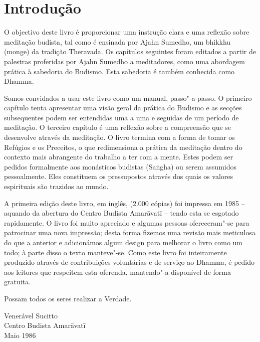 \chapter{Introdução}

O objectivo deste livro é proporcionar uma instrução clara e uma
reflexão sobre meditação budista, tal como é ensinada por Ajahn Sumedho,
um bhikkhu (monge) da tradição Theravada. Os capítulos seguintes foram
editados a partir de palestras proferidas por Ajahn Sumedho
a meditadores, como uma abordagem prática à sabedoria do Budismo. Esta
sabedoria é também conhecida como Dhamma.

Somos convidados a usar este livro como um manual, passo"-a-passo.
O primeiro capítulo tenta apresentar uma visão geral da
prática do Budismo e as secções subsequentes podem ser entendidas uma a
uma e seguidas de um período de meditação. O terceiro capítulo é uma
reflexão sobre a compreensão que se desenvolve através da meditação. O
livro termina com a forma de tomar os Refúgios e os Preceitos, o que
redimensiona a prática da meditação dentro do contexto mais abrangente
do trabalho a ter com a mente. Estes podem ser pedidos formalmente aos
monásticos budistas (Saṅgha) ou serem assumidos pessoalmente. Eles
constituem os pressupostos através dos quais os valores espirituais são
trazidos ao mundo.

A primeira edição deste livro, em inglês, (2.000 cópias) foi impressa em
1985 -- aquando da abertura do Centro Budista Amarāvatī -- tendo esta se
esgotado rapidamente. O livro foi muito apreciado e algumas pessoas
ofereceram"-se para patrocinar uma nova impressão; desta forma fizemos
uma revisão mais meticulosa do que a anterior e adicionámos algum
design para melhorar o livro como um todo; à parte disso o texto
manteve"-se. Como este livro foi inteiramente produzido através de
contribuições voluntárias e de serviço ao Dhamma, é pedido aos leitores
que respeitem esta oferenda, mantendo"-a disponível de forma gratuita.

Possam todos os seres realizar a Verdade.

\bigskip

{\raggedleft
Venerável Sucitto\\
Centro Budista Amarāvatī\\
Maio 1986
\par}


